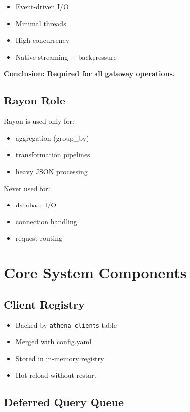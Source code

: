 \documentclass[11pt,a4paper]{article}
\begin{document}
\begin{itemize}
\item Event-driven I/O
\item Minimal threads
\item High concurrency
\item Native streaming + backpressure
\end{itemize}

\textbf{Conclusion: Required for all gateway operations.}

\subsection{Rayon Role}

Rayon is used only for:

\begin{itemize}
\item aggregation (group\_by)
\item transformation pipelines
\item heavy JSON processing
\end{itemize}

Never used for:

\begin{itemize}
\item database I/O
\item connection handling
\item request routing
\end{itemize}

\newpage

\section{Core System Components}

\subsection{Client Registry}

\begin{itemize}
\item Backed by \texttt{athena\_clients} table
\item Merged with config.yaml
\item Stored in in-memory registry
\item Hot reload without restart
\end{itemize}

\subsection{Deferred Query Queue}
\end{document}
